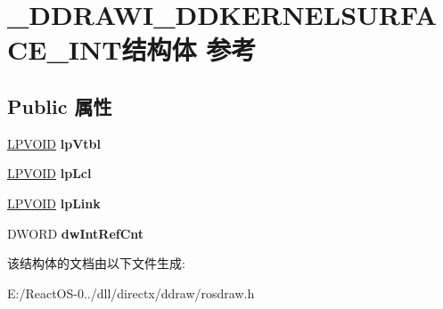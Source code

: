 \hypertarget{struct___d_d_r_a_w_i___d_d_k_e_r_n_e_l_s_u_r_f_a_c_e___i_n_t}{}\section{\+\_\+\+D\+D\+R\+A\+W\+I\+\_\+\+D\+D\+K\+E\+R\+N\+E\+L\+S\+U\+R\+F\+A\+C\+E\+\_\+\+I\+N\+T结构体 参考}
\label{struct___d_d_r_a_w_i___d_d_k_e_r_n_e_l_s_u_r_f_a_c_e___i_n_t}
\subsection*{Public 属性}
\begin{DoxyCompactItemize}
\item 
\mbox{\label{struct___d_d_r_a_w_i___d_d_k_e_r_n_e_l_s_u_r_f_a_c_e___i_n_t_a539fa3d7d3752d45d3ea686344e64939}} 
\hyperlink{interfacevoid}{L\+P\+V\+O\+ID} {\bfseries lp\+Vtbl}
\item 
\mbox{\label{struct___d_d_r_a_w_i___d_d_k_e_r_n_e_l_s_u_r_f_a_c_e___i_n_t_a1769c995b5537ac6f0c7202fc8488090}} 
\hyperlink{interfacevoid}{L\+P\+V\+O\+ID} {\bfseries lp\+Lcl}
\item 
\mbox{\label{struct___d_d_r_a_w_i___d_d_k_e_r_n_e_l_s_u_r_f_a_c_e___i_n_t_a4aada277c2449ecdea5d9cef1ee402ca}} 
\hyperlink{interfacevoid}{L\+P\+V\+O\+ID} {\bfseries lp\+Link}
\item 
\mbox{\label{struct___d_d_r_a_w_i___d_d_k_e_r_n_e_l_s_u_r_f_a_c_e___i_n_t_ac5fd6613f6fce4a60aa213e688022e53}} 
D\+W\+O\+RD {\bfseries dw\+Int\+Ref\+Cnt}
\end{DoxyCompactItemize}


该结构体的文档由以下文件生成\+:\begin{DoxyCompactItemize}
\item 
E\+:/\+React\+O\+S-\/0../dll/directx/ddraw/rosdraw.\+h\end{DoxyCompactItemize}

